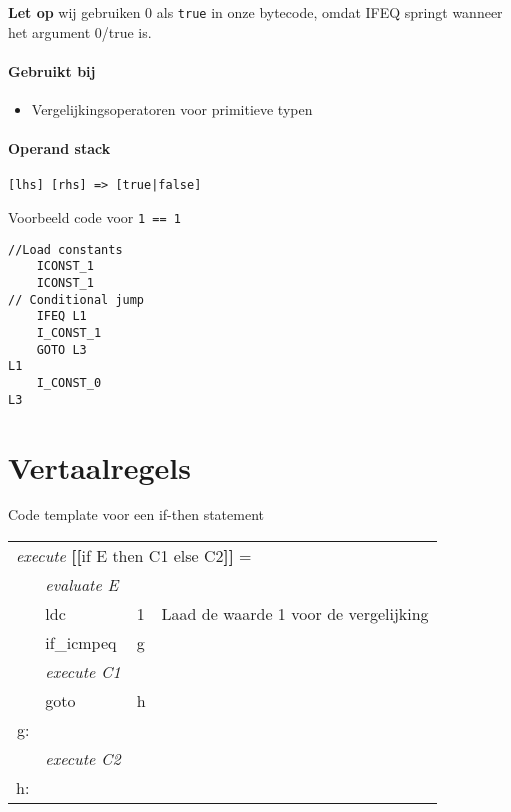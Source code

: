 \textbf{Let op} wij gebruiken 0 als \verb+true+ in onze bytecode, omdat IFEQ springt wanneer het argument 0/true is.

\paragraph{Gebruikt bij}
\begin{itemize}
	\item{Vergelijkingsoperatoren voor primitieve typen}
\end{itemize}

\paragraph{Operand stack}
\verb+[lhs] [rhs] => [true|false]+

Voorbeeld code voor \verb+1 == 1+

\begin{verbatim}
//Load constants
	ICONST_1
	ICONST_1
// Conditional jump
	IFEQ L1
	I_CONST_1
	GOTO L3
L1
	I_CONST_0
L3
\end{verbatim}

\section{Vertaalregels}
\newcommand{\vrname}[2]{\textit{#1} \textbf{[[}#2\textbf{]]} =}


Code template voor een if-then statement\\
{\footnotesize
\begin{tabular}{r l l p{5cm}} %
\multicolumn{4}{l}{\vrname{execute}{if E then C1 else C2}} \\
 & \textit{evaluate E} &  & \\
 & ldc & 1 & Laad de waarde 1 voor de vergelijking \\
 & if\_icmpeq & g &  \\
 & \textit{execute C1} &  & \\
 & goto & h &  \\
g: & & & \\
 & \textit{execute C2} &  & \\
h: &  &  & \\
\end{tabular}
}
